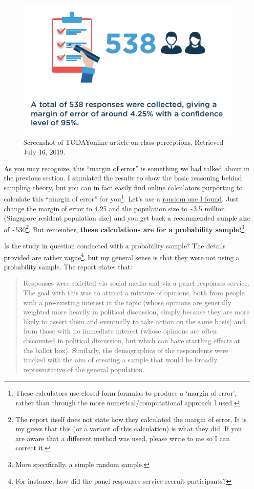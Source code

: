 \documentclass[openany]{book}
\let\rmarkdownfootnote\footnote%
\def\footnote{\protect\rmarkdownfootnote}
\begin{document}
\begin{figure}

{\centering \includegraphics[width=0.6\linewidth]{images/samples/lkyspp_reportsample} 

}

\caption{Screenshot of TODAYonline article on class perceptions. Retrieved July 16, 2019.}\label{fig:today-reportsample}
\end{figure}

As you may recognize, this ``margin of error'' is something we had
talked about in the previous section. I simulated the results to show
the basic reasoning behind sampling theory, but you can in fact easily
find online calculators purporting to calculate this ``margin of error''
for you\footnote{These calculators use closed-form formulas to produce a
  `margin of error', rather than through the more
  numerical/computational approach I used.}. Let's use a
\href{http://www.raosoft.com/samplesize.html}{random one I found}. Just
change the margin of error to 4.25 and the population size to
\textasciitilde{}3.5 million (Singapore resident population size) and
you get back a recommended sample size of \textasciitilde{}530\footnote{The
  report itself does not state how they calculated the margin of error.
  It is my guess that this (or a variant of this calculation) is what
  they did. If you are aware that a different method was used, please
  write to me so I can correct it.}. But remember, \textbf{these
calculations are for a probability sample!}\footnote{More specifically,
  a simple random sample.}

Is the study in question conducted with a probability sample? The
details provided are rather vague\footnote{For instance, how did the
  panel responses service recruit participants?}, but my general sense
is that they were not using a probability sample. The report states
that:

\begin{quote}
Responses were solicited via social media and via a panel responses
service. The goal with this was to attract a mixture of opinions, both
from people with a pre-existing interest in the topic (whose opinions
are generally weighted more heavily in political discussion, simply
because they are more likely to assert them and eventually to take
action on the same basis) and from those with no immediate interest
(whose opinions are often discounted in political discussion, but which
can have startling effects at the ballot box). Similarly, the
demographics of the respondents were tracked with the aim of creating a
sample that would be broadly representative of the general population.
\end{quote}
\end{document}
